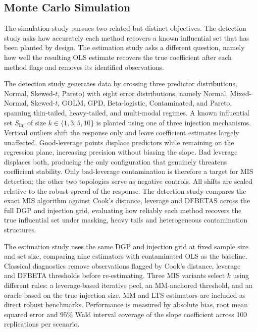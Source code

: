 \documentclass[12pt]{article}
\begin{document}
\subsection{Monte Carlo Simulation}

The simulation study pursues two related but distinct objectives. The detection study asks how accurately each method recovers a known influential set that has been planted by design. The estimation study asks a different question, namely how well the resulting OLS estimate recovers the true coefficient after each method flags and removes its identified observations.

The detection study generates data by crossing three predictor distributions, Normal, Skewed-$t$, Pareto) with eight error distributions, namely Normal, Mixed-Normal, Skewed-$t$, GOLM, GPD, Beta-logistic, Contaminated, and Pareto, spanning thin-tailed, heavy-tailed, and multi-modal regimes. A known influential set $S_{\mathrm{inj}}$ of size $k \in \{1,3,5,10\}$ is planted using one of three injection mechanisms. Vertical outliers shift the response only and leave coefficient estimates largely unaffected. Good-leverage points displace predictors while remaining on the regression plane, increasing precision without biasing the slope. Bad leverage displaces both, producing the only configuration that genuinely threatens coefficient stability. Only bad-leverage contamination is therefore a target for MIS detection; the other two topologies serve as negative controls. All shifts are scaled relative to the robust spread of the response. The detection study compares the exact MIS algorithm against Cook's distance, leverage and DFBETAS across the full DGP and injection grid, evaluating how reliably each method recovers the true influential set under masking, heavy tails and heterogeneous contamination structures.

The estimation study uses the same DGP and injection grid at fixed sample size and set size, comparing nine estimators with contaminated OLS as the baseline. Classical diagnostics remove observations flagged by Cook's distance, leverage and DFBETA thresholds before re-estimating. Three MIS variants select $k$ using different rules: a leverage-based iterative peel, an MM-anchored threshold, and an oracle based on the true injection size. MM and LTS estimators are included as direct robust benchmarks. Performance is measured by absolute bias, root mean squared error and 95\% Wald interval coverage of the slope coefficient across 100 replications per scenario.
\end{document}
